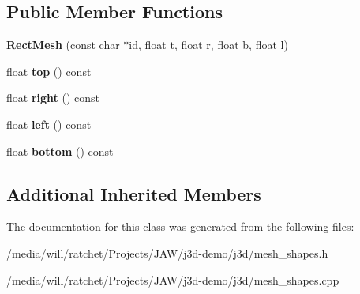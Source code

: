 \subsection*{Public Member Functions}
\begin{DoxyCompactItemize}
\item 
\hypertarget{classj3d_1_1RectMesh_a63087a6a6614881925619442287b47b4}{}{\bfseries Rect\+Mesh} (const char $\ast$id, float t, float r, float b, float l)\label{classj3d_1_1RectMesh_a63087a6a6614881925619442287b47b4}

\item 
\hypertarget{classj3d_1_1RectMesh_a956d8994c6cade28e972caac7a9122e8}{}float {\bfseries top} () const \label{classj3d_1_1RectMesh_a956d8994c6cade28e972caac7a9122e8}

\item 
\hypertarget{classj3d_1_1RectMesh_a1acd5ba6f2dc67d212c3556cd0a02a16}{}float {\bfseries right} () const \label{classj3d_1_1RectMesh_a1acd5ba6f2dc67d212c3556cd0a02a16}

\item 
\hypertarget{classj3d_1_1RectMesh_af385d9f24e73e0508c1119d91e1e83e3}{}float {\bfseries left} () const \label{classj3d_1_1RectMesh_af385d9f24e73e0508c1119d91e1e83e3}

\item 
\hypertarget{classj3d_1_1RectMesh_a34eb4d65e52126bd4a1816c36d6b107c}{}float {\bfseries bottom} () const \label{classj3d_1_1RectMesh_a34eb4d65e52126bd4a1816c36d6b107c}

\end{DoxyCompactItemize}
\subsection*{Additional Inherited Members}


The documentation for this class was generated from the following files\+:\begin{DoxyCompactItemize}
\item 
/media/will/ratchet/\+Projects/\+J\+A\+W/j3d-\/demo/j3d/mesh\+\_\+shapes.\+h\item 
/media/will/ratchet/\+Projects/\+J\+A\+W/j3d-\/demo/j3d/mesh\+\_\+shapes.\+cpp\end{DoxyCompactItemize}
